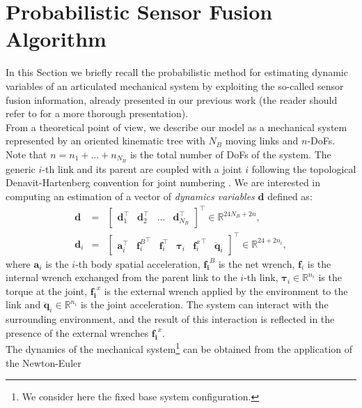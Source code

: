 
\section{Probabilistic Sensor Fusion Algorithm}
%
In this Section we briefly recall the probabilistic method for estimating dynamic variables of
 an articulated mechanical system by exploiting the so-called sensor fusion information,
  already presented
  in our previous work (the reader should refer to \cite{LatellaSensors2016} for a more thorough
   presentation).
\\
\indent
From a theoretical point of view, we describe our model
 as a mechanical system represented by an oriented kinematic tree with $N_B$ moving links and
  $n$-DoFs.  Note that $n=n_1+...+n_{N_B}$ is the total number of DoFs of the system.  The
   generic $i$-th link  and its parent are coupled with a joint $i$ following 
  the topological Denavit-Hartenberg convention for joint numbering \cite{Denavit1955}.
We are interested in computing an estimation of a vector of \emph{dynamics variables} $\bm d$ defined as:
%
\begin{subequations} \label{eq:dynvec} 
	\begin{eqnarray*} 
    	\bm d &=& \begin{bmatrix} \bm d_{1}^\top & \bm
    	d_{2}^\top & \hdots & \bm d_{N_B}^\top \end{bmatrix}^\top 
    	\in \mathbb R^{24N_B+2n},\\
    \bm d_i &=& \begin{bmatrix} \bm
	a_{i}^\top &{\bm f_{i}^B}^\top & \bm f_{i}^\top & \bm \tau_{i} 
	& {\bm f_{i}^x}^\top & \ddot {\bm{q}}_{i} \end{bmatrix}^\top \in
	\mathbb R^{24+2n_i},
	\end{eqnarray*} 
\end{subequations}
%
where $\bm a_i$ is the $i$-th body spatial acceleration, $\bm {f_i}^B$ is the net
 wrench, $\bm f_i$ is the internal wrench exchanged from the parent link to the $i$-th link, 
 $\bm \tau_i \in \mathbb R^{n_i}$ is the torque at the joint, $\bm {f_i}^x$ is the external
  wrench applied by the environment to the link and $ \ddot{\bm q}_i  \in \mathbb R^{n_i}$ is
   the joint acceleration. The system can interact with the surrounding environment, and the
    result of this interaction is reflected in the presence of the external wrenches 
	$\bm {f_i}^x$.
	\\
	\indent
The dynamics of the mechanical system\footnote{We consider here the fixed base system
 configuration.} can be obtained from the application of the Newton-Euler
